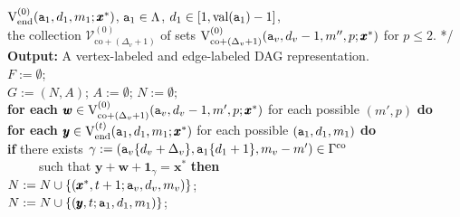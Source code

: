 \documentclass[12pt]{article}
\newcommand{\co}{\mathrm{co}}
\newcommand{\V}{{\rm V}}
\newcommand{\ta}{{\tt a}}
\newcommand{\tb}{{\tt b}}
\newcommand{\w}{\pmb{w}}
\newcommand{\y}{\pmb{y}}
\newcommand{\x}{\pmb{x}}
\newcommand{\1}{\pmb{1}}
\newcommand{\0}{\pmb{0}}
\newcommand{\val}{\mathrm{val}}
\newcommand{\inl}{\mathrm{inl}}
\newcommand{\en}{\mathrm{end}}
\newcommand{\Vv}{\mathcal{V}}
\begin{document}
\begin{tabbing}
                  $\V_{\en}^{(0)}(\ta_1, d_1, m_1; \x^*)$, 
                  $\ta_1 \in \Lambda$,
                  $d_1 \in [1, \val(\ta_1)-1]$, \\
                  the collection $\Vv_{\co+(\Delta_v + 1)}^{(0)}$ of sets 
                 $\V_{\co+(\Delta_v + 1)}^{(0)}(\ta_v, d_{v} -1, 
                 m'', p; \x^*)$
                  for $p \leq 2$.                 
                  */ \- \\
{\bf Output:} A vertex-labeled and edge-labeled DAG representation.\\
%
$F:= \emptyset$;\\
$G := (N, A)$; $A:= \emptyset$; 
$N:= \emptyset;$\\
	{\bf for each} $\w \in \V_{\co+(\Delta_v + 1)}^{(0)}(\ta_v, d_{v} -1, 
                 m', p; \x^*)$ for each possible 
                $(m', p)$ {\bf do} \+ \\%
                {\bf for each} $\y \in 
                \V_{\en}^{(t)}(\ta_1, d_1, m_1; \x^*)$ 
                for each possible $(\ta_1, d_1, m_1)$ {\bf do}\+ \\%
                 {\bf if} there exists  
                 $\gamma:=(\ta_{v}\{d_v+\Delta_v\}, \ta_1\{d_{1}+1\}, m_v - m')
                  \in \Gamma^{\co}$\\
 ~~~~~such that  $ \y + \w + \1_{\gamma} = \x^*$ {\bf then}
 \+ \\ %
 		$N : = N \cup \{ (\x^*, t+1; 
 		\ta_v, d_v, m_v)\}$;\\
 		$N : = N \cup \{ (\y, t; 
 		\ta_1, d_1, m_1)\}$; \\

\end{tabbing}
\end{document}
